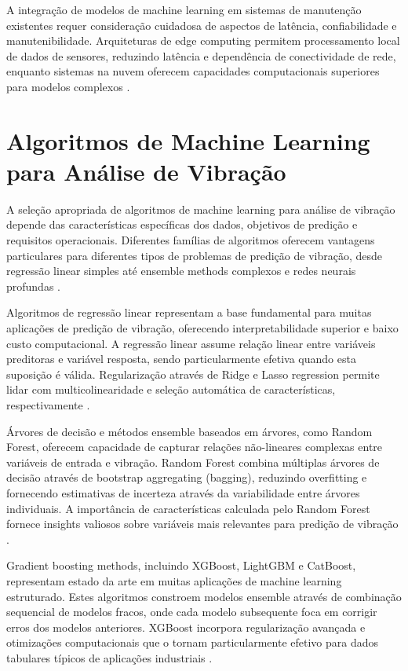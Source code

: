 A integração de modelos de machine learning em sistemas de manutenção existentes requer consideração cuidadosa de aspectos de latência, confiabilidade e manutenibilidade. Arquiteturas de edge computing permitem processamento local de dados de sensores, reduzindo latência e dependência de conectividade de rede, enquanto sistemas na nuvem oferecem capacidades computacionais superiores para modelos complexos \cite{shi2016edge}.

\section{Algoritmos de Machine Learning para Análise de Vibração}
\label{sec:algoritmos-ml}

A seleção apropriada de algoritmos de machine learning para análise de vibração depende das características específicas dos dados, objetivos de predição e requisitos operacionais. Diferentes famílias de algoritmos oferecem vantagens particulares para diferentes tipos de problemas de predição de vibração, desde regressão linear simples até ensemble methods complexos e redes neurais profundas \cite{zhao2019machine}.

Algoritmos de regressão linear representam a base fundamental para muitas aplicações de predição de vibração, oferecendo interpretabilidade superior e baixo custo computacional. A regressão linear assume relação linear entre variáveis preditoras e variável resposta, sendo particularmente efetiva quando esta suposição é válida. Regularização através de Ridge e Lasso regression permite lidar com multicolinearidade e seleção automática de características, respectivamente \cite{hastie2009elements}.

Árvores de decisão e métodos ensemble baseados em árvores, como Random Forest, oferecem capacidade de capturar relações não-lineares complexas entre variáveis de entrada e vibração. Random Forest combina múltiplas árvores de decisão através de bootstrap aggregating (bagging), reduzindo overfitting e fornecendo estimativas de incerteza através da variabilidade entre árvores individuais. A importância de características calculada pelo Random Forest fornece insights valiosos sobre variáveis mais relevantes para predição de vibração \cite{breiman2001random}.

Gradient boosting methods, incluindo XGBoost, LightGBM e CatBoost, representam estado da arte em muitas aplicações de machine learning estruturado. Estes algoritmos constroem modelos ensemble através de combinação sequencial de modelos fracos, onde cada modelo subsequente foca em corrigir erros dos modelos anteriores. XGBoost incorpora regularização avançada e otimizações computacionais que o tornam particularmente efetivo para dados tabulares típicos de aplicações industriais \cite{chen2016xgboost}.

